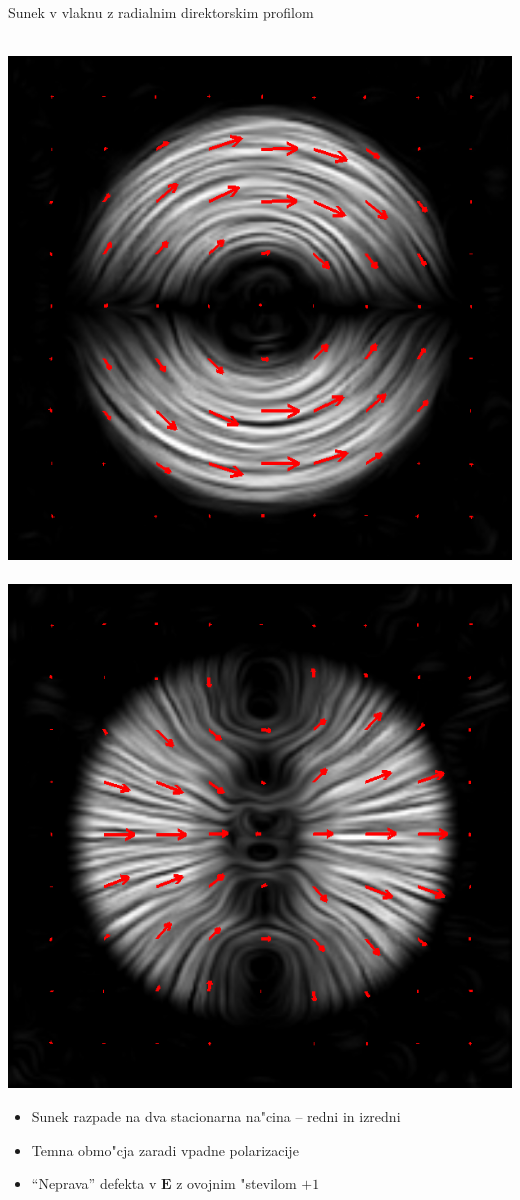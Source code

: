 \documentclass{beamer}
\renewcommand{\vec}{\mathbf}
\begin{document}
\begin{frame}{Sunek v vlaknu z radialnim direktorskim profilom}

 \begin{center}
  \,
 \includegraphics[width=.35\textwidth]{./Slike/licp_p1_74}\,
  \includegraphics[width=.35\textwidth]{./Slike/licp_p1_82}
\end{center}

\begin{itemize}
 \item Sunek razpade na dva stacionarna na"cina -- redni in izredni
 \item Temna obmo"cja zaradi vpadne polarizacije
 \item ``Neprava'' defekta v $\vec E$ z ovojnim "stevilom $+1$
\end{itemize}

\end{frame}
\end{document}
